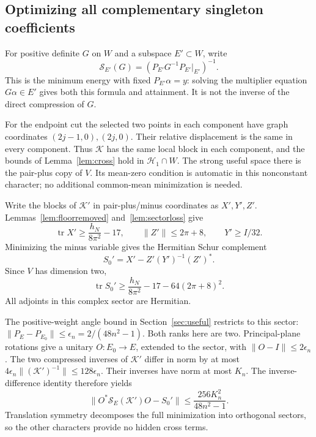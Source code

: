 \documentclass[11pt]{article}
\newcommand{\norm}[1]{\lVert#1\rVert}
\DeclareMathOperator{\tr}{tr}
\theoremstyle{definition}
\theoremstyle{remark}
\begin{document}
\subsection{Optimizing all complementary singleton coefficients}
For positive definite $G$ on $W$ and a subspace $E'\subset W$, write
\[
 \mathcal S_{E'}(G)=(P_{E'}G^{-1}P_{E'}|_{E'})^{-1}.
\]
This is the minimum energy with fixed $P_{E'}\alpha=y$: solving the
multiplier equation $G\alpha\in E'$ gives both this formula and
attainment. It is not the inverse of the direct compression of $G$.

For the endpoint cut the selected two points in each component have
graph coordinates $(2j-1,0),(2j,0)$. Their relative displacement is the
same in every component. Thus $\mathcal K$ has the same local block in
each component, and the bounds of Lemma~\ref{lem:cross} hold in
$\mathcal H_1\cap W$. The strong useful space there is the pair-plus
copy of $V$. Its mean-zero condition is automatic in this nonconstant
character; no additional common-mean minimization is needed.

Write the blocks of $\mathcal K'$ in pair-plus/minus coordinates as
$X',Y',Z'$. Lemmas~\ref{lem:floorremoved} and~\ref{lem:sectorloss} give
\[
 \tr X'\ge\frac{h_N}{8\pi^2}-17,\qquad
 \norm{Z'}\le2\pi+8,\qquad Y'\ge I/32.
\]
Minimizing the minus variable gives the Hermitian Schur complement
\[
 S_0'=X'-Z'(Y')^{-1}(Z')^*.
\]
Since $V$ has dimension two,
\begin{equation}\label{eq:sectortrace}
 \tr S_0'\ge\frac{h_N}{8\pi^2}-17-64(2\pi+8)^2.
\end{equation}
All adjoints in this complex sector are Hermitian.

The positive-weight angle bound in Section~\ref{sec:useful} restricts
to this sector: $\norm{P_E-P_{E_0}}\le\epsilon_n=2/(48n^2-1)$.
Both ranks here are two. Principal-plane rotations give a unitary
$O:E_0\to E$, extended to the sector, with $\norm{O-I}\le2\epsilon_n$.
The two compressed inverses of $\mathcal K'$ differ in norm by at most
$4\epsilon_n\norm{(\mathcal K')^{-1}}\le128\epsilon_n$.
Their inverses have norm at most $K_n$. The inverse-difference identity
therefore yields
\begin{equation}\label{eq:sectorrotation}
 \norm{O^*\mathcal S_E(\mathcal K')O-S_0'}
       \le\frac{256K_n^2}{48n^2-1}.
\end{equation}
Translation symmetry decomposes the full minimization into orthogonal
sectors, so the other characters provide no hidden cross terms.
\end{document}
